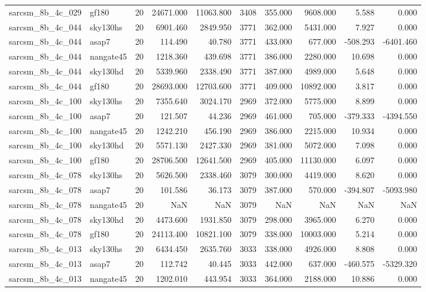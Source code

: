 \begin{longtable}{llrrrrrrrr}
sarcsm\_8b\_4c\_029 & gf180 & 20 & 24671.000 & 11063.800 & 3408 & 355.000 & 9608.000 & 5.588 & 0.000 \\
sarcsm\_8b\_4c\_044 & sky130hs & 20 & 6901.460 & 2849.950 & 3771 & 362.000 & 5431.000 & 7.927 & 0.000 \\
sarcsm\_8b\_4c\_044 & asap7 & 20 & 114.490 & 40.780 & 3771 & 433.000 & 677.000 & -508.293 & -6401.460 \\
sarcsm\_8b\_4c\_044 & nangate45 & 20 & 1218.360 & 439.698 & 3771 & 386.000 & 2280.000 & 10.698 & 0.000 \\
sarcsm\_8b\_4c\_044 & sky130hd & 20 & 5339.960 & 2338.490 & 3771 & 387.000 & 4989.000 & 5.648 & 0.000 \\
sarcsm\_8b\_4c\_044 & gf180 & 20 & 28693.000 & 12703.600 & 3771 & 409.000 & 10892.000 & 3.817 & 0.000 \\
sarcsm\_8b\_4c\_100 & sky130hs & 20 & 7355.640 & 3024.170 & 2969 & 372.000 & 5775.000 & 8.899 & 0.000 \\
sarcsm\_8b\_4c\_100 & asap7 & 20 & 121.507 & 44.236 & 2969 & 461.000 & 705.000 & -379.333 & -4394.550 \\
sarcsm\_8b\_4c\_100 & nangate45 & 20 & 1242.210 & 456.190 & 2969 & 386.000 & 2215.000 & 10.934 & 0.000 \\
sarcsm\_8b\_4c\_100 & sky130hd & 20 & 5571.130 & 2427.330 & 2969 & 381.000 & 5072.000 & 7.098 & 0.000 \\
sarcsm\_8b\_4c\_100 & gf180 & 20 & 28706.500 & 12641.500 & 2969 & 405.000 & 11130.000 & 6.097 & 0.000 \\
sarcsm\_8b\_4c\_078 & sky130hs & 20 & 5626.500 & 2338.460 & 3079 & 300.000 & 4419.000 & 8.620 & 0.000 \\
sarcsm\_8b\_4c\_078 & asap7 & 20 & 101.586 & 36.173 & 3079 & 387.000 & 570.000 & -394.807 & -5093.980 \\
sarcsm\_8b\_4c\_078 & nangate45 & 20 & NaN & NaN & 3079 & NaN & NaN & NaN & NaN \\
sarcsm\_8b\_4c\_078 & sky130hd & 20 & 4473.600 & 1931.850 & 3079 & 298.000 & 3965.000 & 6.270 & 0.000 \\
sarcsm\_8b\_4c\_078 & gf180 & 20 & 24113.400 & 10821.100 & 3079 & 338.000 & 10003.000 & 5.214 & 0.000 \\
sarcsm\_8b\_4c\_013 & sky130hs & 20 & 6434.450 & 2635.760 & 3033 & 338.000 & 4926.000 & 8.808 & 0.000 \\
sarcsm\_8b\_4c\_013 & asap7 & 20 & 112.742 & 40.445 & 3033 & 442.000 & 637.000 & -460.575 & -5329.320 \\
sarcsm\_8b\_4c\_013 & nangate45 & 20 & 1202.010 & 443.954 & 3033 & 364.000 & 2188.000 & 10.886 & 0.000 \\

\end{longtable}
